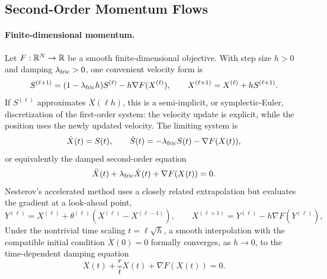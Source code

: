 \subsection{Second-Order Momentum Flows}
\label{sec-second-order-momentum-flows}
\paragraph{Finite-dimensional momentum.}
Let $F:\mathbb{R}^{N}\to\mathbb{R}$ be a smooth finite-dimensional objective. With step size $h>0$ and damping $\lambda_{\rm fric}>0$, one convenient velocity form is
\begin{equation}\label{eq-polyak-momentum}
S^{(\ell+1)}=(1-\lambda_{\rm fric} h)S^{(\ell)}-h\nabla F(X^{(\ell)}),
\qquad
X^{(\ell+1)}=X^{(\ell)}+hS^{(\ell+1)}.
\end{equation}
If $S^{(\ell)}$ approximates $\dot X(\ell h)$, this is a semi-implicit, or symplectic-Euler, discretization of the first-order system: the velocity update is explicit, while the position uses the newly updated velocity. The limiting system is
\begin{equation}\label{eq-heavy-ball-first-order-system}
\dot X(t)=S(t),
\qquad
\dot S(t)=-\lambda_{\rm fric} S(t)-\nabla F(X(t)),
\end{equation}
or equivalently the damped second-order equation
\begin{equation}\label{eq-heavy-ball-ode}
\ddot X(t)+\lambda_{\rm fric}\dot X(t)+\nabla F(X(t))=0.
\end{equation}
Nesterov's accelerated method uses a closely related extrapolation but evaluates the gradient at a look-ahead point,
\begin{equation}\label{eq-nesterov-momentum}
Y^{(\ell)}=X^{(\ell)}+\theta^{(\ell)}(X^{(\ell)}-X^{(\ell-1)}),
\qquad
X^{(\ell+1)}=Y^{(\ell)}-h\nabla F(Y^{(\ell)}),
\end{equation}
Under the nontrivial time scaling \(t=\ell\sqrt h\), a smooth interpolation with the compatible initial condition \(\dot X(0)=0\) formally converges, as \(h\to0\), to the time-dependent damping equation
\begin{equation}\label{eq-nesterov-ode}
\ddot X(t)+\frac{r}{t}\dot X(t)+\nabla F(X(t))=0.
\end{equation}

